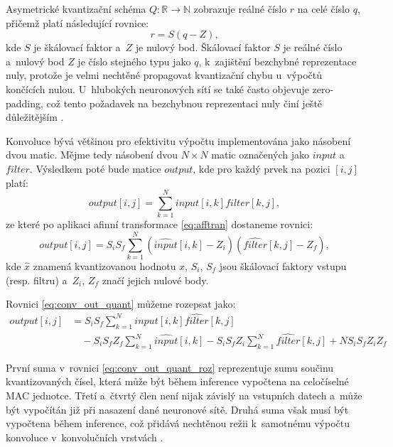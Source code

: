 Asymetrické kvantizační schéma $Q: \mathbb{R} \rightarrow \mathbb{N}$ zobrazuje reálné číslo $r$ na celé číslo $q$, přičemž platí následující rovnice:
\begin{equation}
\label{eq:afftran}
    r = S(q - Z),
\end{equation}
kde $S$ je škálovací faktor a~$Z$ je nulový bod. Škálovací faktor $S$ je reálné číslo a~nulový bod $Z$ je číslo stejného typu jako $q$, k~zajištění bezchybné reprezentace nuly, protože je velmi nechtěné propagovat kvantizační chybu u~výpočtů končících nulou. U~hlubokých neuronových sítí se také často objevuje zero-padding, což tento požadavek na bezchybnou reprezentaci nuly činí ještě důležitějším
\cite{Vaverka_2020}.

Konvoluce bývá většinou pro efektivitu výpočtu implementována jako násobení dvou matic. Mějme tedy násobení dvou $N \times N$ matic označených jako $input$ a~$filter$. Výsledkem poté bude matice $output$, kde pro každý prvek na pozici $[i,j]$ platí:
\begin{equation}
    \label{eq:conv_out}
    output[i,j] = \sum_{k=1}^{N}{input[i,k] filter[k,j]},
\end{equation}
ze které po aplikaci afinní transformace \eqref{eq:afftran} dostaneme rovnici:
\begin{equation}
    \label{eq:conv_out_quant}
    output[i,j] = S_{i} S_{f} \sum_{k=1}^{N}{(\widehat{input}[i,k] - Z_{i}) (\widehat{filter}[k,j] - Z_{f})},
\end{equation}
kde $\widehat{x}$ znamená kvantizovanou hodnotu $x$, $S_i$, $S_f$ jsou škálovací faktory vstupu (resp. filtru) a~$Z_i$, $Z_f$ značí jejich nulové body.

Rovnici \eqref{eq:conv_out_quant} můžeme rozepsat jako:
\begin{equation}
    \label{eq:conv_out_quant_roz}
    \begin{split}
    output[i,j] &= S_{i} S_{f} \sum_{k=1}^{N}{\widehat{input}[i,k] \widehat{filter}[k,j]} \\
    &\quad - S_{i} S_{f} Z_f \sum_{k=1}^{N}{\widehat{input}[i,k]} - S_{i} S_{f} Z_i \sum_{k=1}^{N} {\widehat{filter}[k,j]} + N S_{i} S_{f} Z_i Z_f
\end{split}
\end{equation}

První suma v~rovnici \eqref{eq:conv_out_quant_roz} reprezentuje sumu součinu kvantizovaných čísel, která může být během inference vypočtena na celočíselné MAC jednotce. Třetí a~čtvrtý člen není nijak závislý na vstupních datech a~může být vypočítán již při nasazení dané neuronové sítě. Druhá suma však musí být vypočtena během inference, což přidává nechtěnou režii k~samotnému výpočtu konvoluce v~konvolučních vrstvách \cite{Vaverka_2020, nagel2021white}.

